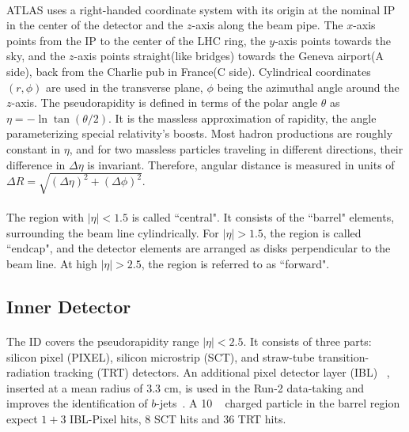 \paragraph{}
ATLAS uses a right-handed coordinate system with its origin at the nominal IP in the center of the detector and the $z$-axis along the beam pipe.
The $x$-axis points from the IP to the center of the LHC ring, the $y$-axis points towards the sky, and the $z$-axis points straight(like bridges) towards the Geneva airport(A side), back from the Charlie pub in France(C side).
Cylindrical coordinates $(r,\phi)$ are used in the transverse plane, $\phi$ being the azimuthal angle around the $z$-axis.
The pseudorapidity is defined in terms of the polar angle $\theta$ as $\eta = -\ln \tan(\theta/2)$. It is the massless approximation of rapidity, the angle parameterizing special relativity's boosts. Most hadron productions are roughly constant in $\eta$, and for two massless particles traveling in different directions, their difference in $\Delta \eta$ is invariant. 
Therefore, angular distance is measured in units of $\Delta R = \sqrt{(\Delta\eta)^{2} + (\Delta\phi)^{2}}$.
\paragraph{}
The region with $|\eta| < 1.5$ is called ``central". It consists of the ``barrel" elements, surrounding the beam line cylindrically. For $|\eta| > 1.5$, the region is called ``endcap", and the detector elements are arranged as disks perpendicular to the beam line. At high $|\eta| > 2.5$, the region is referred to as ``forward".

\subsection{Inner Detector}
\paragraph{}
The ID covers the pseudorapidity range $|\eta| < 2.5$.
It consists of three parts: silicon pixel (PIXEL), silicon microstrip (SCT), and straw-tube transition-radiation tracking (TRT) detectors. 
An additional pixel detector layer (IBL) ~\cite{Capeans:1291633}, inserted at a mean radius of $3.3$ cm, is used in the Run-2 data-taking and improves the identification of $b$-jets~\cite{ATL-PHYS-PUB-2015-022}. A 10 \GeV~ charged particle in the barrel region expect $1+3$ IBL-Pixel hits, $8$ SCT hits and $36$ TRT hits.
